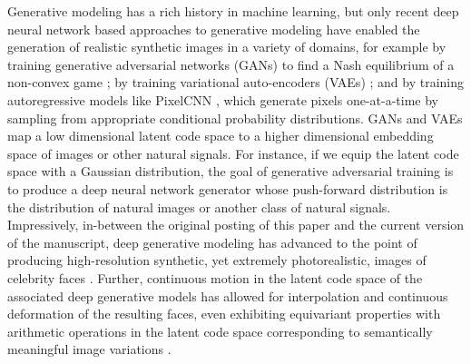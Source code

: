 \documentclass[11pt]{article}
\begin{document}
Generative modeling has a rich history in machine learning, but only recent deep neural network based approaches to generative modeling have enabled the generation of realistic synthetic images in a variety of domains, for example by training generative adversarial networks (GANs) to find a Nash equilibrium of a non-convex game \cite{GAN, hong2017generative}; by training variational auto-encoders (VAEs) \cite{kingma2013auto, rezende2014stochastic}; and by training autoregressive models like PixelCNN \cite{oord2016pixel}, which generate pixels one-at-a-time by sampling from appropriate conditional probability distributions. GANs and VAEs map a low dimensional latent code space to a higher dimensional embedding space of images or other natural signals. For instance, if we equip the latent code space with a Gaussian distribution, the goal of generative adversarial training is to produce a deep neural network generator whose push-forward distribution is the distribution of natural images or another class of natural signals. %
Impressively, in-between the original posting of this paper and the current version of the manuscript, deep generative modeling has advanced to the point of producing high-resolution synthetic, yet extremely photorealistic, images of celebrity faces \cite{karras2017progressive}.  Further, continuous motion in the latent code space of the associated deep generative models has allowed for interpolation and continuous deformation of the resulting faces, even exhibiting equivariant properties with arithmetic operations in the latent code space corresponding to semantically meaningful image variations \cite{radford2015unsupervised}.  


\end{document}
